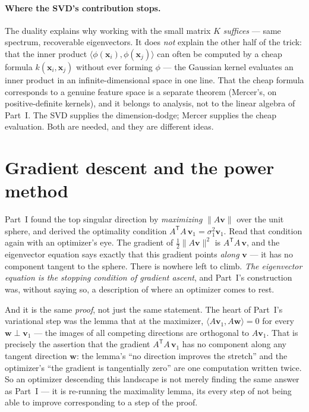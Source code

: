 \documentclass[11pt]{article}
\numberwithin{equation}{section}
\newcommand{\T}{^{\mathsf{T}}}
\newcommand{\ip}[2]{\langle #1, #2 \rangle}
\newcommand{\vv}[1]{\mathbf{v}_{#1}}
\theoremstyle{plainish}
\begin{document}
\paragraph{Where the SVD's contribution stops.} The duality explains why working
with the small matrix $K$ \emph{suffices} --- same spectrum, recoverable
eigenvectors. It does \emph{not} explain the other half of the trick: that the
inner product $\ip{\phi(\mathbf{x}_i)}{\phi(\mathbf{x}_j)}$ can often be computed
by a cheap formula $k(\mathbf{x}_i, \mathbf{x}_j)$ without ever forming
$\phi$ --- the Gaussian kernel evaluates an inner product in an
infinite-dimensional space in one line. That the cheap formula corresponds to a
genuine feature space is a separate theorem (Mercer's, on positive-definite
kernels), and it belongs to analysis, not to the linear algebra of Part~I. The
SVD supplies the dimension-dodge; Mercer supplies the cheap evaluation. Both are
needed, and they are different ideas.

\section{Gradient descent and the power method}
\label{sec:gradient}

Part~I found the top singular direction by \emph{maximizing} $\|A\mathbf{v}\|$
over the unit sphere, and derived the optimality condition
$A\T A\, \vv1 = \sigma_1^2 \vv1$. Read that condition again with an optimizer's
eye. The gradient of $\tfrac12\|A\mathbf{v}\|^2$ is $A\T A\, \mathbf{v}$, and the
eigenvector equation says exactly that this gradient points \emph{along}
$\mathbf{v}$ --- it has no component tangent to the sphere. There is nowhere left
to climb. \emph{The eigenvector equation is the stopping condition of gradient
ascent}, and Part~I's construction was, without saying so, a description of where
an optimizer comes to rest.

And it is the same \emph{proof}, not just the same statement. The heart of
Part~I's variational step was the lemma that at the maximizer,
$\ip{A\vv1}{A\mathbf{w}} = 0$ for every $\mathbf{w} \perp \vv1$ --- the images of
all competing directions are orthogonal to $A\vv1$. That is precisely the
assertion that the gradient $A\T A\,\vv1$ has no component along any tangent
direction $\mathbf{w}$: the lemma's ``no direction improves the stretch'' and the
optimizer's ``the gradient is tangentially zero'' are one computation written
twice. So an optimizer descending this landscape is not merely finding the same
answer as Part~I --- it is re-running the maximality lemma, its every step of not
being able to improve corresponding to a step of the proof.
\end{document}
